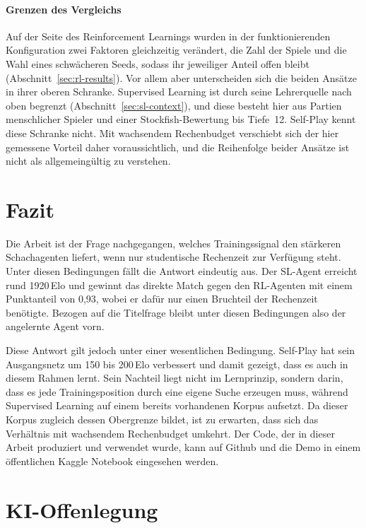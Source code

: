 \documentclass[
  a4paper, 12pt,
  parskip=half,
  headings=small,
  bibliography=totoc
]{scrartcl}
\begin{document}
\paragraph{Grenzen des Vergleichs}
Auf der Seite des Reinforcement Learnings wurden in
der funktionierenden Konfiguration zwei Faktoren gleichzeitig verändert, die Zahl
der Spiele und die Wahl eines schwächeren Seeds, sodass ihr jeweiliger Anteil offen
bleibt (Abschnitt~\ref{sec:rl-results}). Vor allem aber unterscheiden sich die
beiden Ansätze in ihrer oberen Schranke. Supervised Learning ist durch seine
Lehrerquelle nach oben begrenzt (Abschnitt~\ref{sec:sl-context}), und diese besteht
hier aus Partien menschlicher Spieler und einer Stockfish-Bewertung bis
Tiefe~12. Self-Play
kennt diese Schranke nicht. Mit wachsendem Rechenbudget verschiebt sich der hier
gemessene Vorteil daher voraussichtlich, und die Reihenfolge beider Ansätze ist
nicht als allgemeingültig zu verstehen.

\section{Fazit}
Die Arbeit ist der Frage nachgegangen, welches Trainingssignal den stärkeren
Schachagenten liefert, wenn nur studentische Rechenzeit zur Verfügung steht. Unter
diesen Bedingungen fällt die Antwort eindeutig aus. Der SL-Agent
erreicht rund 1920\,Elo und gewinnt das direkte Match gegen den RL-Agenten
mit einem Punktanteil von 0{,}93, wobei er dafür nur einen
Bruchteil der Rechenzeit benötigte. Bezogen auf die Titelfrage bleibt unter diesen
Bedingungen also der angelernte Agent vorn.

Diese Antwort gilt jedoch unter einer wesentlichen Bedingung. Self-Play hat sein
Ausgangsnetz um 150 bis 200\,Elo verbessert und damit gezeigt, dass es auch in
diesem Rahmen lernt. Sein Nachteil liegt nicht im Lernprinzip, sondern darin, dass
es jede Trainingsposition durch eine eigene Suche erzeugen muss, während
Supervised Learning auf einem bereits vorhandenen Korpus aufsetzt. Da dieser Korpus
zugleich dessen Obergrenze bildet, ist zu erwarten, dass sich das
Verhältnis mit wachsendem Rechenbudget umkehrt.
Der Code, der in dieser Arbeit produziert und verwendet wurde, kann auf Github \autocite{gitwithJosh2026chessbot} und die Demo in einem öffentlichen Kaggle Notebook \autocite{hoffmann2026chessnn} eingesehen werden.

\section*{KI-Offenlegung}
\end{document}
